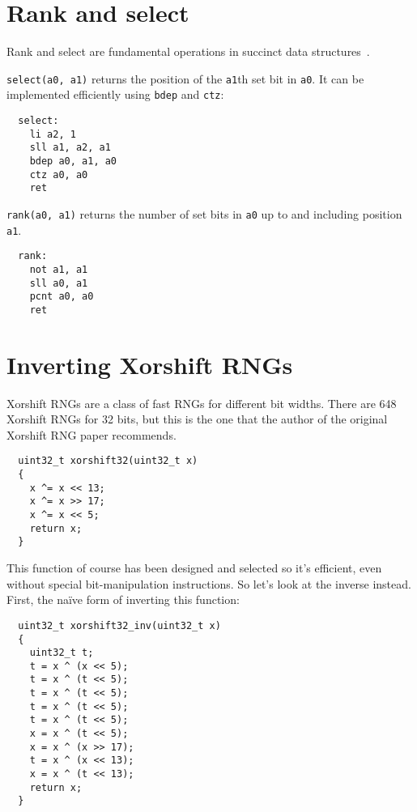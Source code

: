 \section{Rank and select}

Rank and select are fundamental operations in succinct data structures~\cite{SelectX86}.

\texttt{select(a0, a1)} returns the position of the \texttt{a1}th set bit in \texttt{a0}.
It can be implemented efficiently using \texttt{bdep} and \texttt{ctz}:

\begin{minipage}{\linewidth}
\begin{verbatim}
  select:
    li a2, 1
    sll a1, a2, a1
    bdep a0, a1, a0
    ctz a0, a0
    ret
\end{verbatim}
\end{minipage}

\texttt{rank(a0, a1)} returns the number of set bits in \texttt{a0} up to and
including position \texttt{a1}.

\begin{minipage}{\linewidth}
\begin{verbatim}
  rank:
    not a1, a1
    sll a0, a1
    pcnt a0, a0
    ret
\end{verbatim}
\end{minipage}

\section{Inverting Xorshift RNGs}

Xorshift RNGs are a class of fast RNGs for different bit widths. There are 648
Xorshift RNGs for 32 bits, but this is the one that the author of the original
Xorshift RNG paper recommends.~\cite[p. 4]{Xorshift}

\begin{minipage}{\linewidth}
\begin{verbatim}
  uint32_t xorshift32(uint32_t x)
  {
    x ^= x << 13;
    x ^= x >> 17;
    x ^= x << 5;
    return x;
  }
\end{verbatim}
\end{minipage}

This function of course has been designed and selected so it's efficient, even
without special bit-manipulation instructions. So let's look at the inverse
instead. First, the na\"ive form of inverting this function:

\begin{minipage}{\linewidth}
\begin{verbatim}
  uint32_t xorshift32_inv(uint32_t x)
  {
    uint32_t t;
    t = x ^ (x << 5);
    t = x ^ (t << 5);
    t = x ^ (t << 5);
    t = x ^ (t << 5);
    t = x ^ (t << 5);
    x = x ^ (t << 5);
    x = x ^ (x >> 17);
    t = x ^ (x << 13);
    x = x ^ (t << 13);
    return x;
  }
\end{verbatim}
\end{minipage}

